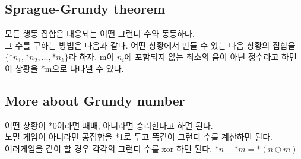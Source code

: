\documentclass[10pt,landscape,a4paper,twocolumn]{article}
\begin{document}
\subsection{Sprague-Grundy theorem}
모든 행동 집합은 대응되는 어떤 그런디 수와 동등하다.\\
그 수를 구하는 방법은 다음과 같다.
어떤 상황에서 만들 수 있는 다음 상황의 집합을 $\{*n_1, *n_2, ..., *n_k\}$라 하자.
m이 $n_i$에 포함되지 않는 최소의 음이 아닌 정수라고 하면 이 상황을 *m으로 나타낼 수 있다.
\subsection{More about Grundy number}
어떤 상황이 *0이라면 패배, 아니라면 승리한다고 하면 된다.\\
노멀 게임이 아니라면 공집합을 *1로 두고 똑같이 그런디 수를 계산하면 된다.\\
여러게임을 같이 할 경우 각각의 그런디 수를 xor 하면 된다.
$*n+*m=*(n \oplus m)$

\iffalse
\section{Etcetera}
\section{Tree Decomposition Method}
\subsection{Heavy Light Decomposition}
\subsection{Centroid Decomposition}
\subsection{Minimum Vertex Cover}
\subsection{Cut Vertex}
\subsection{Cut Edge}
\subsection{Hungarian Method}
\subsection{Line Sweeping}
\subsection{Parametric Search}
\fi
\end{document}
